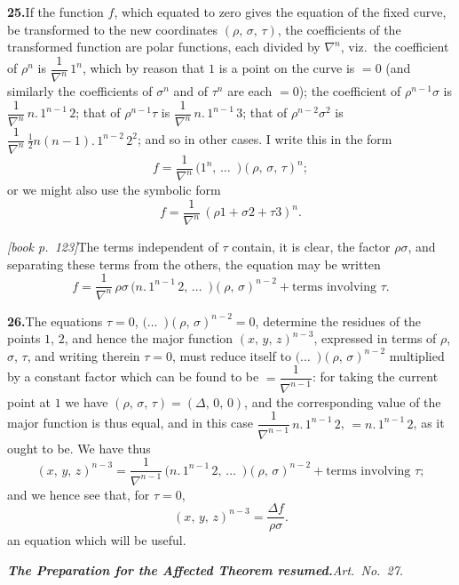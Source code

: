 \documentclass[11pt,a4paper]{article}
\theoremstyle{plain}
\theoremstyle{definition}
\theoremstyle{remark}
\begin{document}
\medskip\noindent\textbf{25.}\quad If the function $f$, which equated to zero gives the equation of the fixed curve, be transformed to the new coordinates $(\rho,\,\sigma,\,\tau)$, the coefficients of the transformed function are polar functions, each divided by $\nabla^n$, viz.\ the coefficient of $\rho^n$ is $\dfrac{1}{\nabla^n}\,1^n$, which by reason that $1$ is a point on the curve is $= 0$ (and similarly the coefficients of $\sigma^n$ and of $\tau^n$ are each $= 0$); the coefficient of $\rho^{n-1}\sigma$ is $\dfrac{1}{\nabla^n}\,n.\,1^{n-1}\,2$; that of $\rho^{n-1}\tau$ is $\dfrac{1}{\nabla^n}\,n.\,1^{n-1}\,3$; that of $\rho^{n-2}\sigma^2$ is $\dfrac{1}{\nabla^n}\,\tfrac{1}{2}n(n - 1).\,1^{n-2}\,2^2$; and so in other cases. I write this in the form
\[
f = \frac{1}{\nabla^n}\,(1^n,\,\ldots\!{\,\,\,)}(\rho,\,\sigma,\,\tau)^n;
\]
or we might also use the symbolic form
\[
f = \frac{1}{\nabla^n}\,(\rho 1 + \sigma 2 + \tau 3)^n.
\]

\noindent\textit{[book p.~123]}\quad The terms independent of $\tau$ contain, it is clear, the factor $\rho\sigma$, and separating these terms from the others, the equation may be written
\[
f = \frac{1}{\nabla^n}\,\rho\sigma\,(n.\,1^{n-1}\,2,\,\ldots\!{\,\,\,)}(\rho,\,\sigma)^{n-2} + \text{terms involving }\tau.
\]

\medskip\noindent\textbf{26.}\quad The equations $\tau = 0$, $(\ldots\!{\,\,\,)}(\rho,\,\sigma)^{n-2} = 0$, determine the residues of the points $1$, $2$, and hence the major function $(x,\,y,\,z)^{n-3}$, expressed in terms of $\rho$, $\sigma$, $\tau$, and writing therein $\tau = 0$, must reduce itself to $(\ldots\!{\,\,\,)}(\rho,\,\sigma)^{n-2}$ multiplied by a constant factor which can be found to be $= \dfrac{1}{\nabla^{n-1}}$: for taking the current point at $1$ we have $(\rho,\,\sigma,\,\tau) = (\Delta,\,0,\,0)$, and the corresponding value of the major function is thus equal, and in this case $\dfrac{1}{\nabla^{n-1}}\,n.\,1^{n-1}\,2$, $= n.\,1^{n-1}\,2$, as it ought to be. We have thus
\[
(x,\,y,\,z)^{n-3} = \frac{1}{\nabla^{n-1}}\,(n.\,1^{n-1}\,2,\,\ldots\!{\,\,\,)}(\rho,\,\sigma)^{n-2} + \text{terms involving }\tau;
\]
and we hence see that, for $\tau = 0$,
\[
(x,\,y,\,z)^{n-3} = \frac{\Delta f}{\rho\sigma}.
\]
an equation which will be useful.

\medskip\noindent\textit{\textbf{The Preparation for the Affected Theorem resumed.}\quad Art.\ No.~27.}
\end{document}
